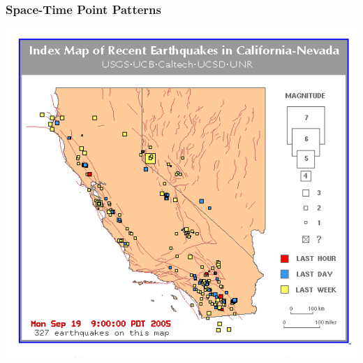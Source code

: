 \documentclass[nototal]{beamer}
\begin{document}
\begin{frame}[<+->]
    \frametitle{Space-Time Point Patterns}
    \begin{center}
      \includegraphics[width=.75\linewidth]{earthquakes.jpg}
    \end{center}
  \end{frame}
\end{document}
